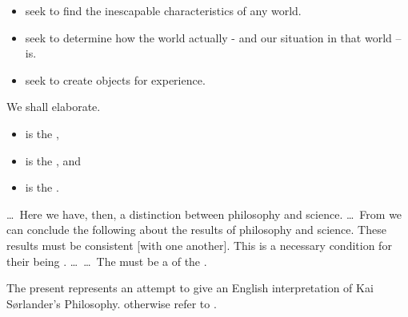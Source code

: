 \noindent
{} 
\begin{itemize}
\item  { seek to find the inescapable
  characteristics of any world.}

\item  { seek to determine how the world
  actually \ysfchgv{-}- and our situation in that world -- is.}

\item  { seek to create objects for experience.}
\end{itemize}
\noindent
\pos{\psno}{\mnewfoil}
We shall elaborate.
\begynd
\pind {}
\begin{itemize}
\item {} is the ,
\item {} is the , and
\item {} is the .
\end{itemize}
\afslut
\noindent
\begynd
\pind 
\ldots\ Here we have, then, a distinction between philosophy and
science. \ldots\ From \cite{kaisorlander1994} we can conclude the
following about the results of philosophy and science. These results
must be consistent [with one another]. This is a necessary condition
for their being . \ldots\ \ldots\ The  must be a
 of the .
\afslut



\begynd
\pind The present  represents an attempt to
      give an English interpretation of Kai S{\o}rlander's Philosophy.
\pind {} otherwise refer to \cite{kaisorlander2023}.
\afslut

